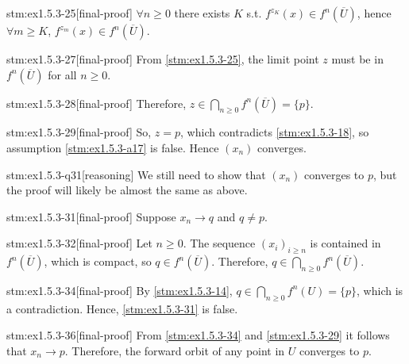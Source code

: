 \begin{stm}{stm:ex1.5.3-25}[final-proof]
$\forall n \ge 0$ there exists $K$ s.t. $f^{z_K}(x) \in f^n(\overline{U})$, hence $\forall m \ge K$, $f^{z_m}(x) \in f^n(\overline{U})$.
\end{stm}

\begin{stm}{stm:ex1.5.3-27}[final-proof]
From \ref{stm:ex1.5.3-25}, the limit point $z$ must be in $f^n(\overline{U})$ for all $n \ge 0$.
\end{stm}

\begin{stm}{stm:ex1.5.3-28}[final-proof]
Therefore, $z \in \bigcap_{n \ge 0} f^n(\overline{U}) = \{p\}$.
\end{stm}

\begin{stm}{stm:ex1.5.3-29}[final-proof]
So, $z = p$, which contradicts \ref{stm:ex1.5.3-18}, so assumption \ref{stm:ex1.5.3-a17} is false. Hence $(x_n)$ converges.
\end{stm}

\begin{stm}{stm:ex1.5.3-q31}[reasoning]
We still need to show that $(x_n)$ converges to $p$, but the proof will likely be almost the same as above.
\end{stm}

\begin{stm}{stm:ex1.5.3-31}[final-proof]
Suppose $x_n \to q$ and $q \ne p$.
\end{stm}

\begin{stm}{stm:ex1.5.3-32}[final-proof]
Let $n \ge 0$. The sequence $(x_i)_{i \ge n}$ is contained in $f^n(\overline{U})$, which is compact, so $q \in f^n(\overline{U})$. Therefore, $q \in \bigcap_{n \ge 0} f^n(\overline{U})$.
\end{stm}

\begin{stm}{stm:ex1.5.3-34}[final-proof]
By \ref{stm:ex1.5.3-14}, $q \in \bigcap_{n \ge 0} f^n(U) = \{p\}$, which is a contradiction. Hence, \ref{stm:ex1.5.3-31} is false.
\end{stm}

\begin{stm}{stm:ex1.5.3-36}[final-proof]
From \ref{stm:ex1.5.3-34} and \ref{stm:ex1.5.3-29} it follows that $x_n \to p$. Therefore, the forward orbit of any point in $U$ converges to $p$.
\end{stm}